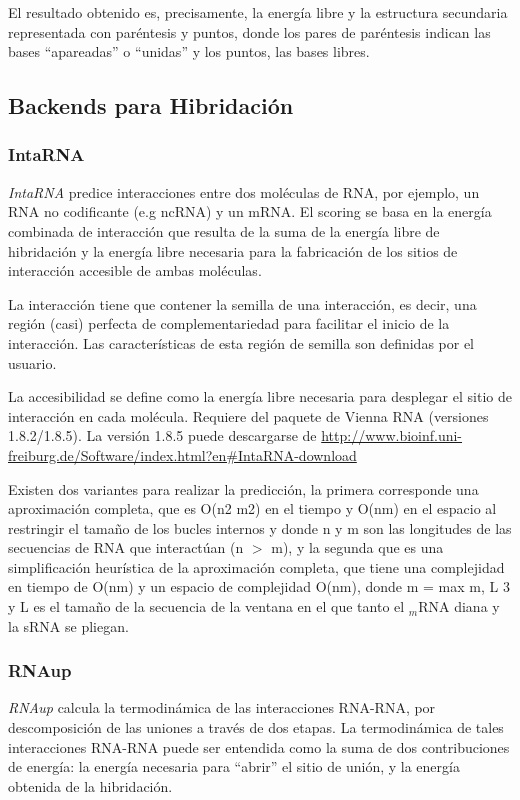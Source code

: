 \par El resultado obtenido es, precisamente, la energía libre y la estructura secundaria representada con paréntesis y puntos, donde los pares de paréntesis indican las bases ``apareadas'' o ``unidas'' y los puntos, las bases libres.

\subsection{Backends para Hibridación} %
\label{hibrid}

\subsubsection{IntaRNA}
\par \emph{IntaRNA\cite{intaRNA}} predice interacciones entre dos moléculas de RNA, por ejemplo, un RNA no codificante (e.g
ncRNA) y un mRNA. El scoring se basa en la energía combinada de interacción que resulta de la suma de la energía libre de hibridación y la energía libre necesaria para la fabricación de los sitios de interacción accesible de ambas moléculas.

\par La interacción tiene que contener la semilla de una interacción, es decir, una región (casi) perfecta de complementariedad para facilitar el inicio de la interacción. Las características de esta región de semilla son definidas por el usuario.

\par La accesibilidad se define como la energía libre necesaria para desplegar el sitio de interacción en cada molécula. Requiere del paquete de Vienna RNA (versiones 1.8.2/1.8.5). La versión 1.8.5 puede descargarse de \url{http://www.bioinf.uni-freiburg.de/Software/index.html?en\#IntaRNA-download}

\par Existen dos variantes para realizar la predicción, la primera corresponde una aproximación completa, que es O(n2 m2) en el tiempo y O(nm) en el espacio al restringir el tamaño de los bucles internos y donde n y m son las longitudes de las secuencias de RNA que interactúan (n $>$ m), y la segunda que es una simplificación heurística de la aproximación completa, que tiene una complejidad en tiempo de O(nm) y un espacio de complejidad O(nm), donde m = max {m, L 3} y L es el tamaño de la secuencia de la ventana en el que tanto el $_m$RNA diana y la sRNA se pliegan.

\subsubsection{RNAup}
\par \emph{RNAup\cite{rnaup}} calcula la termodinámica de las interacciones RNA-RNA, por descomposición de las uniones a
través de dos etapas. La termodinámica de tales interacciones RNA-RNA puede ser entendida como la suma de dos contribuciones de energía: la energía necesaria para ``abrir'' el sitio de unión, y la energía obtenida de la hibridación.

